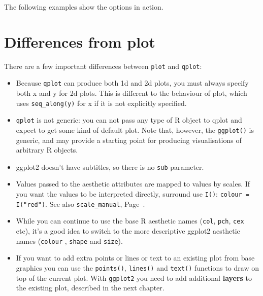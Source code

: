 The following examples show the options in action.

% 

\section{Differences from plot}
\label{sec:plot_diffs}

There are a few important differences between {\tt plot} and {\tt qplot}:

\begin{itemize}
  \item Because {\tt qplot} can produce both 1d and 2d plots, you must always specify both x and y for 2d plots.  This is different to the behaviour of plot, which uses {\tt seq\_along(y)} for x if it is not explicitly specified.
  
  \item {\tt qplot} is not generic: you can not pass any type of R object to qplot and expect to get some kind of default plot.  Note that, however, the {\tt ggplot()} is generic, and may provide a starting point for producing visualisations of arbitrary R objects.
  
  \item ggplot2 doesn't have subtitles, so there is no {\tt sub} parameter.    
  
  \item Values passed to the aesthetic attributes are mapped to values by scales.  If you want the values to be interpreted directly, surround use {\tt I()}: {\tt colour = I("red")}.  See also {\tt scale\_manual}, Page~\pageref{sec:scale_special}.
  
  \item While you can continue to use the base R aesthetic names ({\tt col},  {\tt pch}, {\tt cex} etc), it's a good idea to switch to the more descriptive ggplot2 aesthetic names ({\tt colour} , {\tt shape} and {\tt size}).

  \item If you want to add extra points or lines or text to an existing plot from base graphics you can use the {\tt points()}, {\tt lines()} and {\tt text()} functions to draw on top of the current plot.  With {\tt ggplot2} you need to add additional {\bf layers} to the existing plot, described in the next chapter.
  
\end{itemize}


